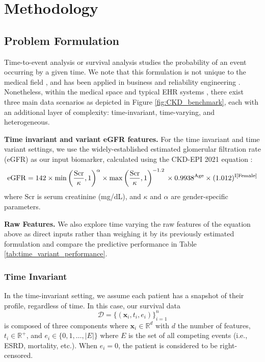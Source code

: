 \section{Methodology}

\subsection{Problem Formulation} \label{sec: problem formulation}

Time-to-event analysis or survival analysis studies the probability of an event occurring by a given time. We note that this formulation is not unique to the medical field \cite{friedman2015fundamentals_medical_clinical_trials}, and has been applied in business \cite{morrison2004introduction_business} and reliability engineering \cite{pena2004models_reliability_engineering}. Nonetheless, within the medical space and typical EHR systems \cite{kline2022multimodal_medical}, there exist three main data scenarios as depicted in Figure \ref{fig:CKD_benchmark}, each with an additional layer of complexity: time-invariant, time-varying, and heterogeneous.

\textbf{Time invariant and variant eGFR features.} For the time invariant and time variant settings, we use the widely-established estimated glomerular filtration rate (eGFR) as our input biomarker, calculated using the CKD-EPI 2021 equation \cite{omuse2024new_creatinine_epi_equation}:
$$
\mathrm{eGFR} = 142 \times \min\left(\frac{\mathrm{Scr}}{\kappa}, 1\right)^{\alpha} \times \max\left(\frac{\mathrm{Scr}}{\kappa}, 1\right)^{-1.2} \\
\times 0.9938^{\mathrm{Age}} \times (1.012)^{\mathrm{I}[\mathrm{Female}]}
$$
where $\mathrm{Scr}$ is serum creatinine (mg/dL), and $\kappa$ and $\alpha$ are gender-specific parameters. 

\textbf{Raw Features.} We also explore time varying the raw features of the equation above as direct inputs rather than weighing it by its previously estimated formulation and compare the predictive performance in Table \ref{tab:time_variant_performance}.

\subsubsection{Time Invariant}
In the time-invariant setting, we assume each patient has a snapshot of their profile, regardless of time. In this case, our survival data
$$\mathcal{D} = \{(\boldsymbol{x}_i, t_i, e_i)\}_{i=1}^n$$
is composed of three components where $\boldsymbol{x}_i \in \mathbb{R}^d$ with $d$ the number of features, $t_i \in \mathbb{R}^+$, and $e_i \in \{0,1,\dots,|E|\}$ where $E$ is the set of all competing events (i.e., ESRD, mortality, etc.). When $e_i = 0$, the patient is considered to be right-censored.

